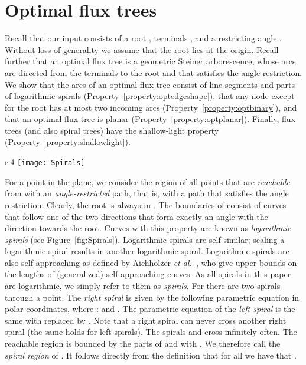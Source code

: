 \documentclass{journalA4}
\newcommand{\etal}{{\emph{et al.}\xspace}}
\begin{document}
\section{Optimal flux trees} \label{sec:props}

Recall that our input consists of a root , terminals , and a restricting angle . Without loss of generality we assume that the root lies at the origin. Recall further that an optimal flux tree is a geometric Steiner arborescence, whose arcs are directed from the terminals to the root and that satisfies the angle restriction. We show that the arcs of an optimal flux tree consist of line segments and parts of logarithmic spirals (Property~\ref{property:optedgeshape}), that any node except for the root has at most two incoming arcs (Property~\ref{property:optbinary}), and that an optimal flux tree is planar (Property~\ref{property:optplanar}). Finally, flux trees (and also spiral trees) have the shallow-light property (Property~\ref{property:shallowlight}).

\bigskip

\begin{wrapfigure}[10]{r}{.4\textwidth}
  \centering
  \texttt{[image: Spirals]}
  \small{\caption{Spirals and spiral regions.\label{fig:Spirals}}}
\end{wrapfigure}
\smallskip{} For a point  in the plane, we consider the region  of all points that are \emph{reachable} from  with an \emph{angle-restricted} path, that is, with a path that satisfies the angle restriction.
Clearly, the root  is always in . The boundaries of  consist of curves that follow one of the two directions that form exactly an angle  with the direction towards the root. Curves with this property are known as \emph{logarithmic spirals} (see Figure~\ref{fig:Spirals}). Logarithmic spirals are self-similar; scaling a logarithmic spiral results in another logarithmic spiral. Logarithmic spirals are also self-approaching as defined by Aichholzer \etal~\cite{Aichholzer2001}, who give upper bounds on the lengths of (generalized) self-approaching curves. As all spirals in this paper are logarithmic, we simply refer to them as \emph{spirals}. For  there are two spirals through a point. The \emph{right spiral}  is given by the following parametric equation in polar coordinates, where :  and .
The parametric equation of the \emph{left spiral}  is the same with  replaced by . Note that a right spiral  can never cross another right spiral  (the same holds for left spirals).
The spirals  and  cross infinitely often. The reachable region  is bounded by the parts of  and  with
. We therefore call  the \emph{spiral region} of . It follows directly from the definition that for all  we have that .
\end{document}
